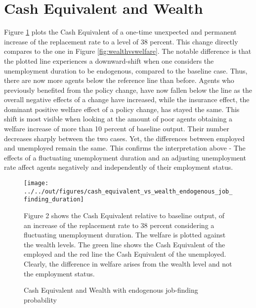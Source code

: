 \documentclass[a4paper,11pt]{article}
\begin{document}
\section{Cash Equivalent and Wealth} 

Figure \ref{cash_equivalent_vs_wealth_transitions} plots the Cash Equivalent of a one-time unexpected and permanent increase of the replacement rate to a level of 38 percent. This change directly compares to the one in Figure \ref{fig:wealthvswelfare}. The notable difference is that the plotted line experiences a downward-shift when one considers the unemployment duration to be endogenous, compared to the baseline case. Thus, there are now more agents below the reference line than before. Agents who previously benefited from the policy change, have now fallen below the line as the overall negative effects of a change have increased, while the insurance effect, the dominant positive welfare effect of a policy change, has stayed the same. This shift is most visible when looking at the amount of poor agents obtaining a welfare increase of more than 10 percent of baseline output. Their number decreases sharply between the two cases. Yet, the differences between employed and unemployed remain the same. This confirms the interpretation above - The effects of a fluctuating unemployment duration and an adjusting unemployment rate affect agents negatively and independently of their employment status.

\begin{figure}[!htbp]
\caption{Cash Equivalent and Wealth with endogenous job-finding probability} 
\label{cash_equivalent_vs_wealth_transitions}	%
\centering
\texttt{[image: ../../out/figures/cash\_equivalent\_vs\_wealth\_endogenous\_job\_finding\_duration]} %

\begin{minipage}{0.8\linewidth}
\footnotesize{Figure 2 shows the Cash Equivalent relative to baseline output, of an increase of the replacement rate to 38 percent considering a fluctuating unemployment duration. The welfare is plotted against the wealth levels. The green line shows the Cash Equivalent of the employed and the red line the Cash Equivalent of the unemployed. Clearly, the difference in welfare arises from the wealth level and not the employment status.}
\end{minipage}

\end{figure}
\end{document}
